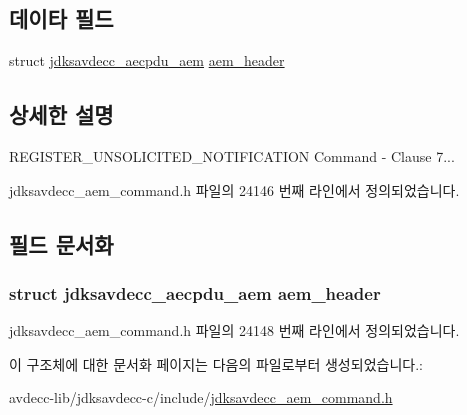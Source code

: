 \subsection*{데이타 필드}
\begin{DoxyCompactItemize}
\item 
struct \hyperlink{structjdksavdecc__aecpdu__aem}{jdksavdecc\+\_\+aecpdu\+\_\+aem} \hyperlink{structjdksavdecc__aem__command__register__unsolicited__notification_ae1e77ccb75ff5021ad923221eab38294}{aem\+\_\+header}
\end{DoxyCompactItemize}


\subsection{상세한 설명}
R\+E\+G\+I\+S\+T\+E\+R\+\_\+\+U\+N\+S\+O\+L\+I\+C\+I\+T\+E\+D\+\_\+\+N\+O\+T\+I\+F\+I\+C\+A\+T\+I\+ON Command -\/ Clause 7... 

jdksavdecc\+\_\+aem\+\_\+command.\+h 파일의 24146 번째 라인에서 정의되었습니다.



\subsection{필드 문서화}
\subsubsection[{\texorpdfstring{aem\+\_\+header}{aem_header}}]{\setlength{\rightskip}{0pt plus 5cm}struct {\bf jdksavdecc\+\_\+aecpdu\+\_\+aem} aem\+\_\+header}\hypertarget{structjdksavdecc__aem__command__register__unsolicited__notification_ae1e77ccb75ff5021ad923221eab38294}{}\label{structjdksavdecc__aem__command__register__unsolicited__notification_ae1e77ccb75ff5021ad923221eab38294}


jdksavdecc\+\_\+aem\+\_\+command.\+h 파일의 24148 번째 라인에서 정의되었습니다.



이 구조체에 대한 문서화 페이지는 다음의 파일로부터 생성되었습니다.\+:\begin{DoxyCompactItemize}
\item 
avdecc-\/lib/jdksavdecc-\/c/include/\hyperlink{jdksavdecc__aem__command_8h}{jdksavdecc\+\_\+aem\+\_\+command.\+h}\end{DoxyCompactItemize}
